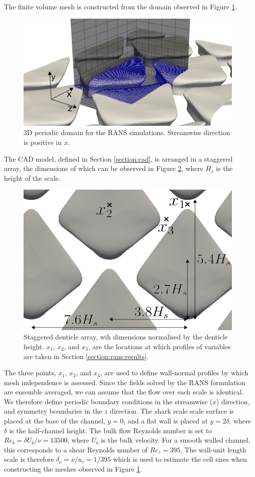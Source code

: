 \documentclass[12pt,oneside,a4paper]{article}
\begin{document}
The finite volume mesh is constructed from the domain observed in Figure \ref{figure:rans:methodology:periodicDomain}.
% 
\begin{figure}[!b]
\centering
\includegraphics[width = 0.7\linewidth]{images/CFD_meshIndependence/periodicDomain.png}
\caption{3D periodic domain for the RANS simulations. Streamwise direction is positive in $x$.}
\label{figure:rans:methodology:periodicDomain}
\end{figure}
%
The CAD model, defined in Section \ref{section:cad}, is arranged in a staggered array, the dimensions of which can be observed in Figure \ref{figure:rans:methodology:periodicDomain3}, where $H_s$ is the height of the scale.
% 
\begin{figure}[!t]
\centering
\includegraphics[width = 0.7\linewidth]{images/CFD_meshIndependence/periodicDomain3.png}
\caption{Staggered denticle array, wih dimensions normalised by the denticle height. $x_1$, $x_2$, and $x_3$, are the locations at which profiles of variables are taken in Section \ref{section:rans:results}.}
\label{figure:rans:methodology:periodicDomain3}
\end{figure}
%
The three points, $x_1$, $x_2$, and $x_3$, are used to define wall-normal profiles by which mesh independence is assessed. Since the fields solved by the RANS formulation are ensemble averaged, we can assume that the flow over each scale is identical. We therefore define periodic boundary conditions in the streamwise ($x$) direction, and symmetry boundaries in the $z$ direction. The shark scale scale surface is placed at the base of the channel, $y=0$, and a flat wall is placed at $y=2 \delta$, where $\delta$ is the half-channel height. The bulk flow Reynolds number is set to $Re_b = \delta U_b/ \nu = 13500$, where $U_b$ is the bulk velocity. For a smooth walled channel, this corresponds to a shear Reynolds number of $Re_\tau = 395$. The wall-unit length scale is therefore $\delta_\nu = \nu /u_\tau = 1/395$ which is used to estimate the cell sizes when constructing the meshes observed in Figure \ref{figure:rans:methodology:periodicDomain}.
\end{document}
